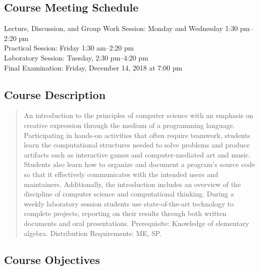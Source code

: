 \documentclass[11pt]{article}
\begin{document}
\subsection*{Course Meeting Schedule}

Lecture, Discussion, and Group Work Session: Monday and Wednesday 1:30 pm--2:20 pm \\
Practical Session: Friday 1:30 am--2:20 pm \\
Laboratory Session: Tuesday, 2:30 pm--4:20 pm \\
Final Examination: Friday, December 14, 2018 at 7:00 pm

\subsection*{Course Description}

\begin{quote}

An introduction to the principles of computer science with an emphasis on
creative expression through the medium of a programming language. Participating
in hands-on activities that often require teamwork, students learn the
computational structures needed to solve problems and produce artifacts such as
interactive games and computer-mediated art and music. Students also learn how
to organize and document a program's source code so that it effectively
communicates with the intended users and maintainers. Additionally, the
introduction includes an overview of the discipline of computer science and
computational thinking. During a weekly laboratory session students use
state-of-the-art technology to complete projects, reporting on their results
through both written documents and oral presentations.
Prerequisite: Knowledge of elementary algebra.
Distribution Requirements: ME, SP.\@ \\

\end{quote}

\subsection*{Course Objectives}
\end{document}
